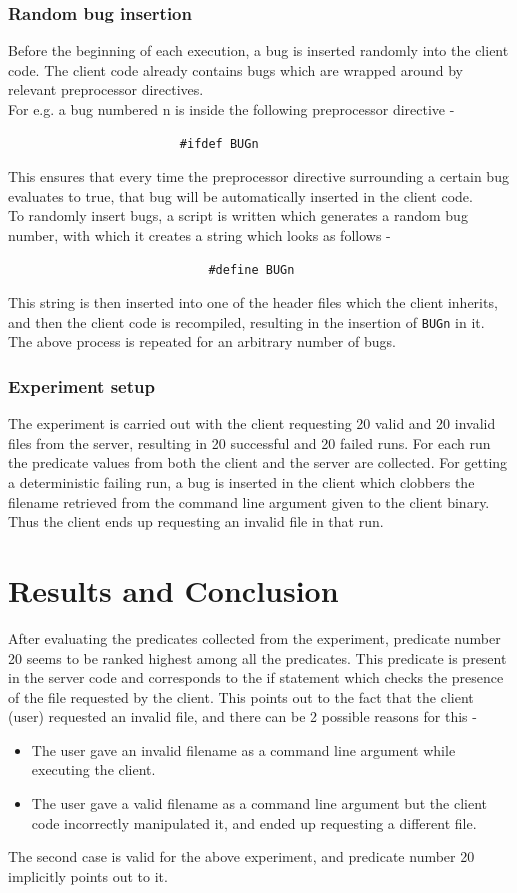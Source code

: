 \documentclass[a4paper,10pt, margin=0.75in]{article}
\begin{document}
\subsubsection{Random bug insertion}
Before the beginning of each execution, a bug is inserted randomly into the client code. The client code already contains bugs which are wrapped around by relevant preprocessor directives. \\
For e.g. a bug numbered n is inside the following preprocessor directive -
\begin{verbatim}
                        #ifdef BUGn
\end{verbatim}
This ensures that every time the preprocessor directive surrounding a certain bug evaluates to true, that bug will be automatically inserted in the client code. \\
To randomly insert bugs, a script is written which generates a random bug number, with which it creates a string which looks as follows -
\begin{verbatim}
                            #define BUGn
\end{verbatim}
This string is then inserted into one of the header files which the client inherits, and then the client code is recompiled, resulting in the insertion of \texttt{BUGn} in it. \\
The above process is repeated for an arbitrary number of bugs.

\subsubsection{Experiment setup}
The experiment is carried out with the client requesting 20 valid and 20 invalid files from the server, resulting in 20 successful and 20 failed runs. For each run the predicate values from both the client and the server are collected. For getting a deterministic failing run, a bug is inserted in the client which clobbers the filename retrieved from the command line argument given to the client binary. Thus the client ends up requesting an invalid file in that run.


\section{Results and Conclusion}
After evaluating the predicates collected from the experiment, predicate number 20 seems to be ranked highest among all the predicates. This predicate is present in the server code and corresponds to the if statement which checks the presence of the file requested by the client. This points out to the fact that the client (user) requested an invalid file, and there can be 2 possible reasons for this -
\begin{itemize}
    \item The user gave an invalid filename as a command line argument while executing the client.
    \item The user gave a valid filename as a command line argument but the client code incorrectly manipulated it, and ended up requesting a different file.
\end{itemize}

The second case is valid for the above experiment, and predicate number 20 implicitly points out to it.

\medskip


\end{document}
